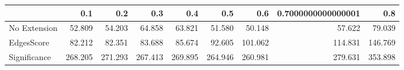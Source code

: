 \begin{tabular}{lrrrrrrrr}
\toprule
{} &     0.1 &     0.2 &     0.3 &     0.4 &     0.5 &     0.6 & 0.7000000000000001 &     0.8 \\
\midrule
No Extension &  52.809 &  54.203 &  64.858 &  63.821 &  51.580 &  50.148 &             57.622 &  79.039 \\
EdgesScore   &  82.212 &  82.351 &  83.688 &  85.674 &  92.605 & 101.062 &            114.831 & 146.769 \\
Significance & 268.205 & 271.293 & 267.413 & 269.895 & 264.946 & 260.981 &            279.631 & 353.898 \\
\bottomrule
\end{tabular}
